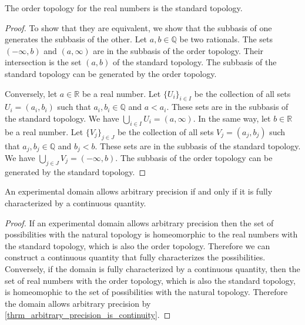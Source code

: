 \documentclass[11pt,letterpaper,fleqn]{memoir} %
\begin{document}
\begin{mathSection}
	\begin{prop}
		The order topology for the real numbers is the standard topology.
	\end{prop}
	\begin{proof}
		To show that they are equivalent, we show that the subbasis of one generates the subbasis of the other. Let $a,b \in \mathbb{Q}$ be two rationals. The sets $(-\infty, b)$ and $(a, \infty)$ are in the subbasis of the order topology. Their intersection is the set $(a, b)$ of the standard topology. The subbasis of the standard topology can be generated by the order topology.
		
		Conversely, let $a \in \mathbb{R}$ be a real number. Let $\{U_i\}_{i \in I}$ be the collection of all sets $U_i = (a_i, b_i)$ such that $a_i, b_i \in \mathbb{Q}$ and $a < a_i$. These sets are in the subbasis of the standard topology. We have $\bigcup\limits_{i \in I} U_i = (a, \infty)$. In the same way, let $b \in \mathbb{R}$ be a real number. Let $\{V_j\}_{j \in J}$ be the collection of all sets $V_j = (a_j, b_j)$ such that $a_j, b_j \in \mathbb{Q}$ and $b_j < b$. These sets are in the subbasis of the standard topology. We have $\bigcup\limits_{j \in J} V_j = (-\infty, b)$. The subbasis of the order topology can be generated by the standard topology.
	\end{proof}
	
	\begin{prop}
		An experimental domain allows arbitrary precision if and only if it is fully characterized by a continuous quantity.
	\end{prop}
	
	\begin{proof}
		If an experimental domain allows arbitrary precision then the set of possibilities with the natural topology is homeomorphic to the real numbers with the standard topology, which is also the order topology. Therefore we can construct a continuous quantity that fully characterizes the possibilities. Conversely, if the domain is fully characterized by a continuous quantity, then the set of real numbers with the order topology, which is also the standard topology, is homeomophic to the set of possibilities with the natural topology. Therefore the domain allows arbitrary precision by \ref{thrm_arbitrary_precision_is_continuity}.
	\end{proof}	
\end{mathSection}
\end{document}
